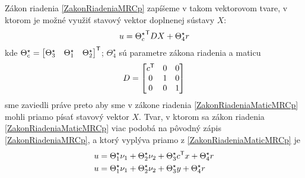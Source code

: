 \documentclass[a4paper, 10pt, ]{article}
\begin{document}
Zákon riadenia \eqref{ZakonRiadeniaMRCp} zapíšeme v takom vektorovom tvare, v ktorom je možné využiť stavový vektor doplnenej sústavy $X$:
\begin{equation} \label{ZakonRiadeniaMaticMRCp}
	u = {\Theta_c^\star}^{\mathsf{T}} D X + \Theta_4^\star r
\end{equation}
kde $ \Theta_c^\star = \begin{bmatrix} \Theta_3^\star & \Theta_1^\star & \Theta_2^\star \end{bmatrix}^{\mathsf{T}} $; $\Theta_4^\star$ sú parametre zákona riadenia a maticu
\begin{align*}
	D = \begin{bmatrix} c^{\mathsf{T}} & 0 & 0 \\ 0 & 1 & 0 \\ 0 & 0 & 1 \end{bmatrix}
\end{align*}
sme zaviedli práve preto aby sme v zákone riadenia \eqref{ZakonRiadeniaMaticMRCp} mohli priamo písať stavový vektor $X$. Tvar, v ktorom sa zákon riadenia \eqref{ZakonRiadeniaMaticMRCp} viac podobá na pôvodný zápis \eqref{ZakonRiadeniaMRCp}, a ktorý vyplýva priamo z \eqref{ZakonRiadeniaMaticMRCp} je
\begin{subequations} \label{ZakonRiadeniaMaticMRCp_02}
	\begin{align}
		u &= \Theta_1^\star \nu_1 + \Theta_2^\star \nu_2 + \Theta_3^\star {c}^{\mathsf{T}} x + \Theta_4^\star r \\
		u &= \Theta_1^\star \nu_1 + \Theta_2^\star \nu_2 + \Theta_3^\star y + \Theta_4^\star r
	\end{align}
\end{subequations}
\end{document}
